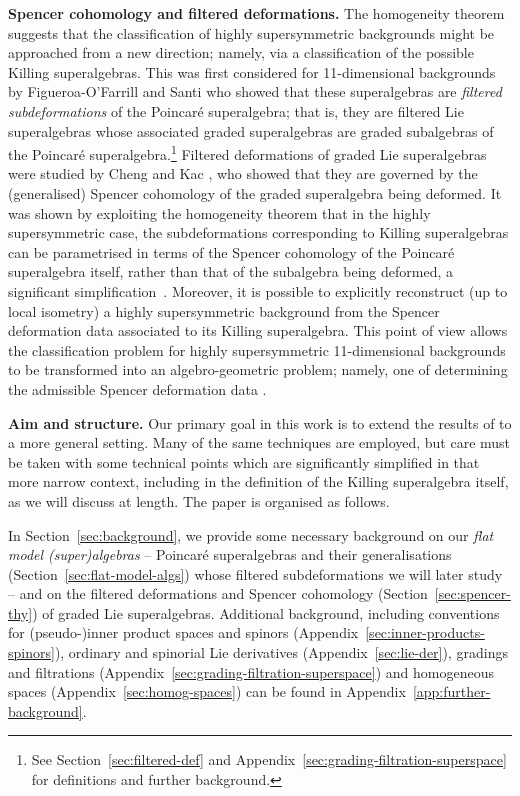 \documentclass[10pt,a4paper]{amsart}
\numberwithin{equation}{section}
\newcommand{\1}{\mathbbm{1}}
\begin{document}
{\bf Spencer cohomology and filtered deformations.}
The homogeneity theorem suggests that the classification of highly supersymmetric backgrounds might be approached from a new direction; namely, via a classification of the possible Killing superalgebras. This was first considered for 11-dimensional backgrounds by Figueroa-O'Farrill and Santi \cite{Figueroa-OFarrill2017_1,Figueroa-OFarrill2017,Santi2022} who showed that these superalgebras are \emph{filtered subdeformations} of the Poincar\'e superalgebra; that is, they are filtered Lie superalgebras whose associated graded superalgebras are graded subalgebras of the Poincar\'e superalgebra.\footnote{See Section~\ref{sec:filtered-def} and Appendix~\ref{sec:grading-filtration-superspace} for definitions and further background.} Filtered deformations of graded Lie superalgebras were studied by Cheng and Kac \cite{Cheng1998}, who showed that they are governed by the (generalised) Spencer cohomology of the graded superalgebra being deformed. It was shown by exploiting the homogeneity theorem that in the highly supersymmetric case, the subdeformations corresponding to Killing superalgebras can be parametrised in terms of the Spencer cohomology of the Poincar\'e superalgebra itself, rather than that of the subalgebra being deformed, a significant simplification~\cite{Figueroa-OFarrill2017_1}. Moreover, it is possible to explicitly reconstruct (up to local isometry) a highly supersymmetric background from the Spencer deformation data associated to its Killing superalgebra. This point of view allows the classification problem for highly supersymmetric 11-dimensional backgrounds to be transformed into an algebro-geometric problem; namely, one of determining the admissible Spencer deformation data \cite{Santi2022}.

{\bf Aim and structure.}
Our primary goal in this work is to extend the results of \cite{Figueroa-OFarrill2017_1} to a more general setting. Many of the same techniques are employed, but care must be taken with some technical points which are significantly simplified in that more narrow context, including in the definition of the Killing superalgebra itself, as we will discuss at length. The paper is organised as follows.

In Section~\ref{sec:background}, we provide some necessary background on our \emph{flat model (super)algebras} -- Poincar\'e superalgebras and their generalisations (Section~\ref{sec:flat-model-algs}) whose filtered subdeformations we will later study -- and on the filtered deformations and Spencer cohomology (Section~\ref{sec:spencer-thy}) of graded Lie superalgebras. Additional background, including conventions for (pseudo-)inner product spaces and spinors (Appendix~\ref{sec:inner-products-spinors}), ordinary and spinorial Lie derivatives (Appen\-dix~\ref{sec:lie-der}), gradings and filtrations (Appendix~\ref{sec:grading-filtration-superspace}) and homogeneous spaces (Appendix~\ref{sec:homog-spaces}) can be found in Appendix~\ref{app:further-background}.
\end{document}
